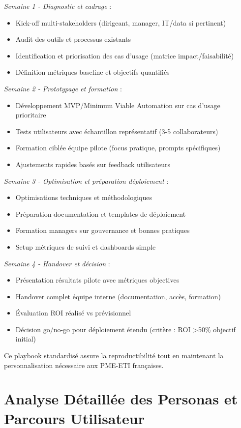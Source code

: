 \textit{Semaine 1 - Diagnostic et cadrage} :
\begin{itemize}
    \item Kick-off multi-stakeholders (dirigeant, manager, IT/data si pertinent)
    \item Audit des outils et processus existants
    \item Identification et priorisation des cas d'usage (matrice impact/faisabilité)
    \item Définition métriques baseline et objectifs quantifiés
\end{itemize}
\medskip
\textit{Semaine 2 - Prototypage et formation} :
\begin{itemize}
    \item Développement MVP/Minimum Viable Automation sur cas d'usage prioritaire
    \item Tests utilisateurs avec échantillon représentatif (3-5 collaborateurs)
    \item Formation ciblée équipe pilote (focus pratique, prompts spécifiques)
    \item Ajustements rapides basés sur feedback utilisateurs
\end{itemize}
\medskip
\textit{Semaine 3 - Optimisation et préparation déploiement} :
\begin{itemize}
    \item Optimisations techniques et méthodologiques
    \item Préparation documentation et templates de déploiement
    \item Formation managers sur gouvernance et bonnes pratiques
    \item Setup métriques de suivi et dashboards simple
\end{itemize}
\medskip
\textit{Semaine 4 - Handover et décision} :
\begin{itemize}
    \item Présentation résultats pilote avec métriques objectives
    \item Handover complet équipe interne (documentation, accès, formation)
    \item Évaluation ROI réalisé vs prévisionnel
    \item Décision go/no-go pour déploiement étendu (critère : ROI >50\% objectif initial)
\end{itemize}
\medskip
Ce playbook standardisé assure la reproductibilité tout en maintenant la personnalisation nécessaire aux PME-ETI françaises.

\section{Analyse Détaillée des Personas et Parcours Utilisateur}

